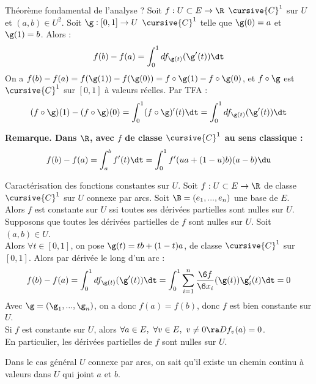 \documentclass[11pt]{article}
\begin{document}
\begin{prop}{Théorème fondamental de l'analyse ?}{}
    Soit $f:U\subset E\to\R$ $\cursive{C}^1$ sur $U$ et $(a,b)\in U^2$. Soit $\g:[0,1]\to U$ $\cursive{C}^1$ telle que $\g(0)=a$ et $\g(1)=b$. Alors :
    \begin{equation*}
        f(b) - f(a) = \int_0^1 df_{\g(t)}(\g'(t))\dt
    \end{equation*}
    \tcblower
    On a $f(b)-f(a)=f(\g(1))-f(\g(0))=f\circ\g(1) - f\circ\g(0)$, et $f\circ\g$ est $\cursive{C}^1$ sur $[0,1]$ à valeurs réelles. Par TFA :
    \begin{equation*}
        (f\circ \g)(1) - (f\circ\g)(0) = \int_0^1 (f\circ \g)'(t)\dt = \int_0^1 df_{\g(t)}(\g'(t))\dt
    \end{equation*}
\end{prop}

\bf{Remarque.} Dans $\R$, avec $f$ de classe $\cursive{C}^1$ au sens classique :
\begin{equation*}
    f(b) - f(a) = \int_a^b f'(t)\dt = \int_0^1 f'(u a + (1-u)b)(a-b)\du
\end{equation*}

\begin{prop}{Caractérisation des fonctions constantes sur $U$.}{}
    Soit $f:U\subset E \to \R$ de classe $\cursive{C}^1$ sur $U$ connexe par arcs. Soit $\B=(e_1,...,e_n)$ une base de $E$.\\ 
    Alors $f$ est constante sur $U$ ssi toutes ses dérivées partielles sont nulles sur $U$.
    \tcblower
    \boxed{\la} Supposons que toutes les dérivées partielles de $f$ sont nulles sur $U$. Soit $(a,b)\in U$.\\
    Alors $\forall t \in [0,1]$, on pose $\g(t)=tb+(1-t)a$, de classe $\cursive{C}^1$ sur $[0,1]$. Alors par dérivée le long d'un arc :
    \begin{equation*}
        f(b) - f(a) = \int_0^1 df_{\g(t)}(\g'(t))\dt = \int_0^1 \sum_{i=1}^n \frac{\6 f}{\6 x_i}(\g(t))\g_i'(t)\dt = 0
    \end{equation*}
    Avec $\g=(\g_1,...,\g_n)$, on a donc $f(a)=f(b)$, donc $f$ est bien constante sur $U$.\\
    \boxed{\ra} Si $f$ est constante sur $U$, alors $\forall a \in E, ~ \forall v \in E, ~ v\neq 0 \ra Df_v(a)=0$.\\
    En particulier, les dérivées partielles de $f$ sont nulles sur $U$.
\end{prop}

Dans le cas général $U$ connexe par arcs, on sait qu'il existe un chemin continu à valeurs dans $U$ qui joint $a$ et $b$.
\end{document}
